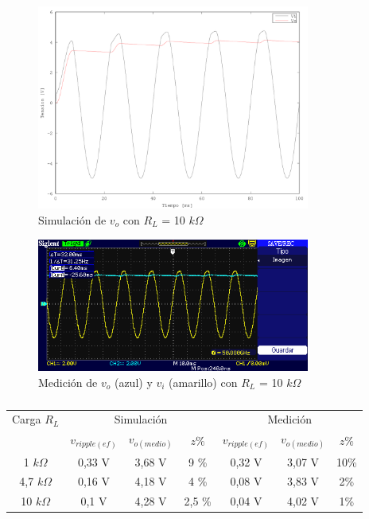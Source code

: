 \begin{figure}[H]
  \centering
      \includegraphics[width=0.8\textwidth]{gfxsantiago/FIG_SIM_Rectificador_Simple_3B3.png}
  \caption{Simulación de $v_{o}$ con $R_{L}$ = 10 $k\Omega$}
\end{figure}

\begin{figure}[H]
  \centering
      \includegraphics[width=0.8\textwidth]{gfxsantiago/FIG_MED_Rectificador_Simple_3B3.png}
  \caption{Medición de $v_{o}$ (azul) y $v_{i}$ (amarillo) con $R_{L}$ = 10 $k\Omega$}
  \label{fig:med_3B3}
\end{figure}

\begin{table}
\centering
\begin{tabular}{ccccccc}
\toprule
Carga $R_{L}$  & \multicolumn{3}{c}{Simulación}  & \multicolumn{3}{c}{Medición} \\

             & $v_{ripple(ef)}$    & $v_{o(medio)}$    &   $z\%$	& $v_{ripple(ef)}$    & $v_{o(medio)}$    &   $z\%$ \\
\midrule
1 $k\Omega$            & 0,33 V    & 3,68 V   & 9 \%	& 0,32 V    & 3,07 V   & 10\% \\
4,7 $k\Omega$            & 0,16 V    & 4,18 V   & 4 \%	& 0,08 V    & 3,83 V   & 2\% \\
10 $k\Omega$            & 0,1 V    & 4,28 V   & 2,5 \%	& 0,04 V    & 4,02 V   & 1\% \\
\bottomrule
\end{tabular}
\caption{}
\label{table:rect_simple}
\end{table}

